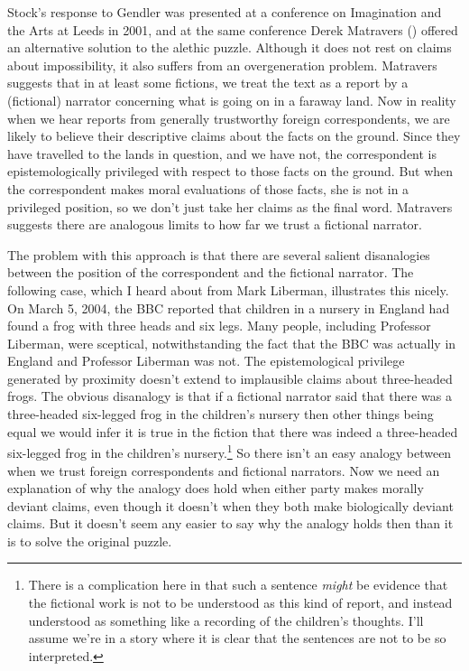 \documentclass[
  10pt,
  letterpaper,
  DIV=11,
  numbers=noendperiod,
  twoside]{scrartcl}
\begin{document}
Stock's response to Gendler was presented at a conference on Imagination
and the Arts at Leeds in 2001, and at the same conference Derek
Matravers () offered an alternative
solution to the alethic puzzle. Although it does not rest on claims
about impossibility, it also suffers from an overgeneration problem.
Matravers suggests that in at least some fictions, we treat the text as
a report by a (fictional) narrator concerning what is going on in a
faraway land. Now in reality when we hear reports from generally
trustworthy foreign correspondents, we are likely to believe their
descriptive claims about the facts on the ground. Since they have
travelled to the lands in question, and we have not, the correspondent
is epistemologically privileged with respect to those facts on the
ground. But when the correspondent makes moral evaluations of those
facts, she is not in a privileged position, so we don't just take her
claims as the final word. Matravers suggests there are analogous limits
to how far we trust a fictional narrator.

The problem with this approach is that there are several salient
disanalogies between the position of the correspondent and the fictional
narrator. The following case, which I heard about from Mark Liberman,
illustrates this nicely. On March 5, 2004, the BBC reported that
children in a nursery in England had found a frog with three heads and
six legs. Many people, including Professor Liberman, were sceptical,
notwithstanding the fact that the BBC was actually in England and
Professor Liberman was not. The epistemological privilege generated by
proximity doesn't extend to implausible claims about three-headed frogs.
The obvious disanalogy is that if a fictional narrator said that there
was a three-headed six-legged frog in the children's nursery then other
things being equal we would infer it is true in the fiction that there
was indeed a three-headed six-legged frog in the children's
nursery.\footnote{There is a complication here in that such a sentence
  \emph{might} be evidence that the fictional work is not to be
  understood as this kind of report, and instead understood as something
  like a recording of the children's thoughts. I'll assume we're in a
  story where it is clear that the sentences are not to be so
  interpreted.} So there isn't an easy analogy between when we trust
foreign correspondents and fictional narrators. Now we need an
explanation of why the analogy does hold when either party makes morally
deviant claims, even though it doesn't when they both make biologically
deviant claims. But it doesn't seem any easier to say why the analogy
holds then than it is to solve the original puzzle.
\end{document}
